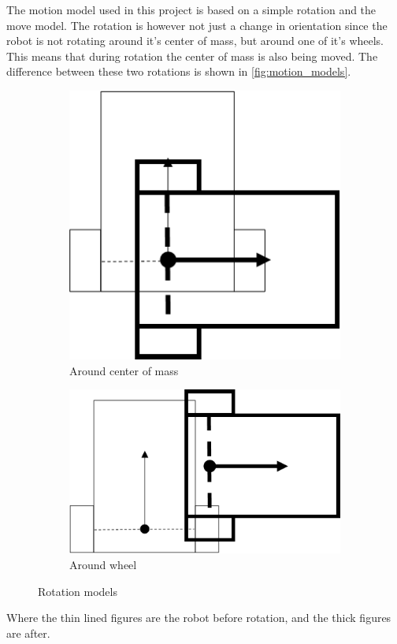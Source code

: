 \documentclass[Main]{subfiles}
\begin{document}
		The motion model used in this project is based on a simple rotation and the move model.
		The rotation is however not just a change in orientation since the robot is not rotating around it's center of mass, but around one of it's wheels.
		This means that during rotation the center of mass is also being moved.
		The difference between these two rotations is shown in \autoref{fig:motion_models}.
		\begin{figure}[h]
			\centering
			\begin{subfigure}[b]{0.45\linewidth}
				\includegraphics[scale=0.8]{./Figures/motion_model1.png}
				\caption{Around center of mass}
				\label{fig:motion_model1}
			\end{subfigure}	
			\begin{subfigure}[b]{0.45\linewidth}
				\includegraphics[scale=0.8]{./Figures/motion_model2.png}
				\caption{Around wheel}
				\label{fig:motion_model2}
			\end{subfigure}
		\caption{Rotation models}
		\label{fig:motion_models}
		\end{figure}
		Where the thin lined figures are the robot before rotation, and the thick figures are after.
\end{document}
